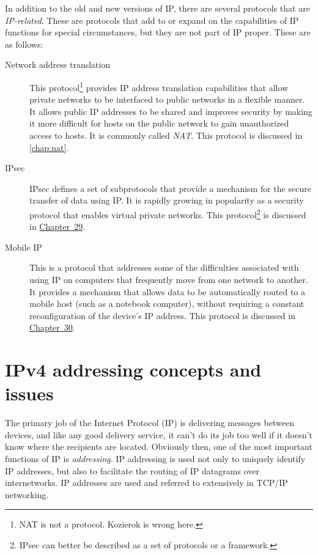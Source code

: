 \documentclass[b5paper,11pt]{memoir}
\begin{document}
In addition to the old and new versions of IP, there are several protocols that are {\emph{IP-related}}.
These are protocols that add to or expand on the capabilities of IP functions for special circumstances, but they are not part of IP proper.
These are as follows:
\begin{description}
   \item[Network address translation]
      This protocol\footnote{NAT is not a protocol. Kozierok is wrong here.} provides IP address translation capabilities that allow private networks to be interfaced to public networks in a flexible manner.
      It allows public IP addresses to be shared and improves security by making it more difficult for hosts on the public network to gain unauthorized access to hosts.
      It is commonly called {\emph{NAT}}.
      This protocol is discussed in \vref{chap:nat}.

   \item[IPsec]
      IPsec defines a set of subprotocols that provide a mechanism for the secure transfer of data using IP.
      It is rapidly growing in popularity as a security protocol that enables virtual private networks.
      This protocol\footnote{IPsec can better be described as a set of protocols or a framework.} is discussed in \protect\hyperlink{ch29.html}{Chapter~29}.

   \item[Mobile IP]
      This is a protocol that addresses some of the difficulties associated with using IP on computers that frequently move from one network to another.
      It provides a mechanism that allows data to be automatically routed to a mobile host (such as a notebook computer), without requiring a constant reconfiguration of the device's IP address.
      This protocol is discussed in \protect\hyperlink{ch30.html}{Chapter~30}.
\end{description}





\chapter{IPv4 addressing concepts and issues}
\label{chap:kozierok-ch16}

The primary job of the Internet Protocol (IP) is delivering messages
between devices, and like any good delivery service, it can't do its job
too well if it doesn't know where the recipients are located. Obviously
then, one of the most important functions of IP is {\emph{addressing}}.
IP addressing is used not only to uniquely identify IP addresses, but
also to facilitate the routing of IP datagrams over internetworks. IP
addresses are used and referred to extensively in TCP/IP networking.
\end{document}
